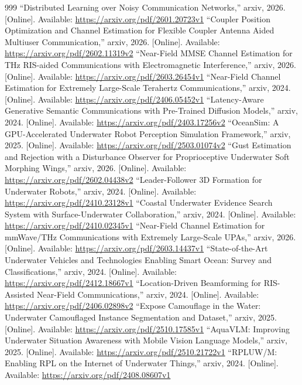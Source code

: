 \documentclass[10pt,journal]{IEEEtran}
\begin{document}
\begin{thebibliography}{999}
 ``Distributed Learning over Noisy Communication Networks,'' arxiv, 2026. [Online]. Available: \url{https://arxiv.org/pdf/2601.20723v1}
 ``Coupler Position Optimization and Channel Estimation for Flexible Coupler Antenna Aided Multiuser Communication,'' arxiv, 2026. [Online]. Available: \url{https://arxiv.org/pdf/2602.11319v2}
 ``Near-Field MMSE Channel Estimation for THz RIS-aided Communications with Electromagnetic Interference,'' arxiv, 2026. [Online]. Available: \url{https://arxiv.org/pdf/2603.26454v1}
 ``Near-Field Channel Estimation for Extremely Large-Scale Terahertz Communications,'' arxiv, 2024. [Online]. Available: \url{https://arxiv.org/pdf/2406.05452v1}
 ``Latency-Aware Generative Semantic Communications with Pre-Trained Diffusion Models,'' arxiv, 2024. [Online]. Available: \url{https://arxiv.org/pdf/2403.17256v2}
 ``OceanSim: A GPU-Accelerated Underwater Robot Perception Simulation Framework,'' arxiv, 2025. [Online]. Available: \url{https://arxiv.org/pdf/2503.01074v2}
 ``Gust Estimation and Rejection with a Disturbance Observer for Proprioceptive Underwater Soft Morphing Wings,'' arxiv, 2026. [Online]. Available: \url{https://arxiv.org/pdf/2602.04438v2}
 ``Leader-Follower 3D Formation for Underwater Robots,'' arxiv, 2024. [Online]. Available: \url{https://arxiv.org/pdf/2410.23128v1}
 ``Coastal Underwater Evidence Search System with Surface-Underwater Collaboration,'' arxiv, 2024. [Online]. Available: \url{https://arxiv.org/pdf/2410.02345v1}
 ``Near-Field Channel Estimation for mmWave/THz Communications with Extremely Large-Scale UPAs,'' arxiv, 2026. [Online]. Available: \url{https://arxiv.org/pdf/2603.14437v1}
 ``State-of-the-Art Underwater Vehicles and Technologies Enabling Smart Ocean: Survey and Classifications,'' arxiv, 2024. [Online]. Available: \url{https://arxiv.org/pdf/2412.18667v1}
 ``Location-Driven Beamforming for RIS-Assisted Near-Field Communications,'' arxiv, 2024. [Online]. Available: \url{https://arxiv.org/pdf/2406.02898v2}
 ``Expose Camouflage in the Water: Underwater Camouflaged Instance Segmentation and Dataset,'' arxiv, 2025. [Online]. Available: \url{https://arxiv.org/pdf/2510.17585v1}
 ``AquaVLM: Improving Underwater Situation Awareness with Mobile Vision Language Models,'' arxiv, 2025. [Online]. Available: \url{https://arxiv.org/pdf/2510.21722v1}
 ``RPLUW/M: Enabling RPL on the Internet of Underwater Things,'' arxiv, 2024. [Online]. Available: \url{https://arxiv.org/pdf/2408.08607v1}

\end{thebibliography}
\end{document}
